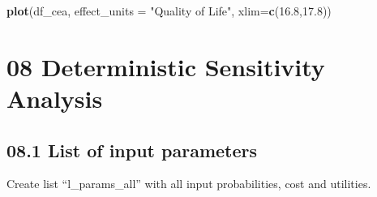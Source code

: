 \documentclass[
]{article}
\newenvironment{Shaded}{\begin{snugshade}}{\end{snugshade}}
\newcommand{\DataTypeTok}[1]{\textcolor[rgb]{0.13,0.29,0.53}{#1}}
\newcommand{\FloatTok}[1]{\textcolor[rgb]{0.00,0.00,0.81}{#1}}
\newcommand{\KeywordTok}[1]{\textcolor[rgb]{0.13,0.29,0.53}{\textbf{#1}}}
\newcommand{\NormalTok}[1]{#1}
\newcommand{\StringTok}[1]{\textcolor[rgb]{0.31,0.60,0.02}{#1}}
\begin{document}
\begin{Shaded}
\begin{Highlighting}[]
\KeywordTok{plot}\NormalTok{(df_cea, }\DataTypeTok{effect_units =} \StringTok{"Quality of Life"}\NormalTok{, }\DataTypeTok{xlim=}\KeywordTok{c}\NormalTok{(}\FloatTok{16.8}\NormalTok{,}\FloatTok{17.8}\NormalTok{))}
\end{Highlighting}
\end{Shaded}

\hypertarget{deterministic-sensitivity-analysis}{%
\section{08 Deterministic Sensitivity
Analysis}\label{deterministic-sensitivity-analysis}}

\hypertarget{list-of-input-parameters}{%
\subsection{08.1 List of input
parameters}\label{list-of-input-parameters}}

Create list ``l\_params\_all'' with all input probabilities, cost and
utilities.
\end{document}
